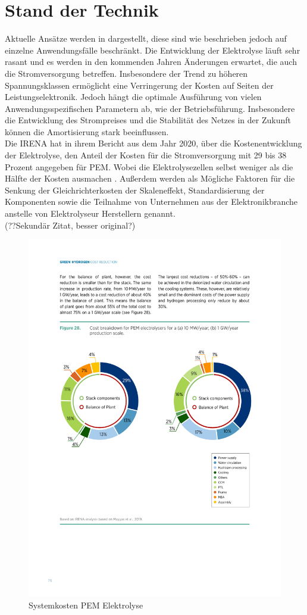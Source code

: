 \section{Stand der Technik}
Aktuelle Ansätze werden in \cite{HydrogenRectifier} dargestellt, diese sind wie beschrieben jedoch auf einzelne Anwendungsfälle beschränkt. Die Entwicklung der Elektrolyse läuft sehr rasant und es werden in den kommenden Jahren Änderungen erwartet, die auch die Stromversorgung betreffen. Insbesondere der Trend zu höheren Spannungsklassen ermöglicht eine Verringerung der Kosten auf Seiten der Leistungselektronik. Jedoch hängt die optimale Ausführung von vielen Anwendungsspezifischen Parametern ab, wie der Betriebsführung. Insbesondere die Entwicklung des Strompreises und die Stabilität des Netzes in der Zukunft können die Amortisierung stark beeinflussen.\\
Die \gls{IRENA} hat in ihrem Bericht aus dem Jahr 2020, über die Kostenentwicklung der Elektrolyse, den Anteil der Kosten für die Stromversorgung mit 29 bis 38 Prozent angegeben für \gls{PEM}. Wobei die Elektrolysezellen selbst weniger als die Hälfte der Kosten ausmachen \cite{IRENA2020}. Außerdem werden als Mögliche Faktoren für die Senkung der Gleichrichterkosten der Skaleneffekt, Standardisierung der Komponenten sowie die Teilnahme von Unternehmen aus der Elektronikbranche anstelle von Elektrolyseur Herstellern genannt.\\
(??Sekundär Zitat, besser original?)\\
\begin{figure}
	\centering
	\includegraphics[width=0.7\linewidth]{content/Grafiken/ElyCost}
	\caption[Systemkosten PEM Elektrolyse]{Systemkosten \gls{PEM} Elektrolyse \cite{IRENA2020}}
	\label{fig:elycost}
\end{figure}


